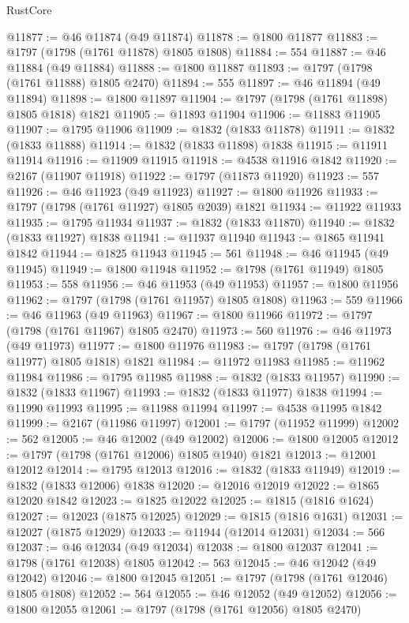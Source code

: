 \begin{lexlean}{RustCore}
\begin{coremodule}
@11877 := @46 @11874 (@49 @11874)
@11878 := @1800 @11877
@11883 := @1797 (@1798 (@1761 @11878) @1805 @1808)
@11884 := 554
@11887 := @46 @11884 (@49 @11884)
@11888 := @1800 @11887
@11893 := @1797 (@1798 (@1761 @11888) @1805 @2470)
@11894 := 555
@11897 := @46 @11894 (@49 @11894)
@11898 := @1800 @11897
@11904 := @1797 (@1798 (@1761 @11898) @1805 @1818) @1821
@11905 := @11893 @11904
@11906 := @11883 @11905
@11907 := @1795 @11906
@11909 := @1832 (@1833 @11878)
@11911 := @1832 (@1833 @11888)
@11914 := @1832 (@1833 @11898) @1838
@11915 := @11911 @11914
@11916 := @11909 @11915
@11918 := @4538 @11916 @1842
@11920 := @2167 (@11907 @11918)
@11922 := @1797 (@11873 @11920)
@11923 := 557
@11926 := @46 @11923 (@49 @11923)
@11927 := @1800 @11926
@11933 := @1797 (@1798 (@1761 @11927) @1805 @2039) @1821
@11934 := @11922 @11933
@11935 := @1795 @11934
@11937 := @1832 (@1833 @11870)
@11940 := @1832 (@1833 @11927) @1838
@11941 := @11937 @11940
@11943 := @1865 @11941 @1842
@11944 := @1825 @11943
@11945 := 561
@11948 := @46 @11945 (@49 @11945)
@11949 := @1800 @11948
@11952 := @1798 (@1761 @11949) @1805
@11953 := 558
@11956 := @46 @11953 (@49 @11953)
@11957 := @1800 @11956
@11962 := @1797 (@1798 (@1761 @11957) @1805 @1808)
@11963 := 559
@11966 := @46 @11963 (@49 @11963)
@11967 := @1800 @11966
@11972 := @1797 (@1798 (@1761 @11967) @1805 @2470)
@11973 := 560
@11976 := @46 @11973 (@49 @11973)
@11977 := @1800 @11976
@11983 := @1797 (@1798 (@1761 @11977) @1805 @1818) @1821
@11984 := @11972 @11983
@11985 := @11962 @11984
@11986 := @1795 @11985
@11988 := @1832 (@1833 @11957)
@11990 := @1832 (@1833 @11967)
@11993 := @1832 (@1833 @11977) @1838
@11994 := @11990 @11993
@11995 := @11988 @11994
@11997 := @4538 @11995 @1842
@11999 := @2167 (@11986 @11997)
@12001 := @1797 (@11952 @11999)
@12002 := 562
@12005 := @46 @12002 (@49 @12002)
@12006 := @1800 @12005
@12012 := @1797 (@1798 (@1761 @12006) @1805 @1940) @1821
@12013 := @12001 @12012
@12014 := @1795 @12013
@12016 := @1832 (@1833 @11949)
@12019 := @1832 (@1833 @12006) @1838
@12020 := @12016 @12019
@12022 := @1865 @12020 @1842
@12023 := @1825 @12022
@12025 := @1815 (@1816 @1624)
@12027 := @12023 (@1875 @12025)
@12029 := @1815 (@1816 @1631)
@12031 := @12027 (@1875 @12029)
@12033 := @11944 (@12014 @12031)
@12034 := 566
@12037 := @46 @12034 (@49 @12034)
@12038 := @1800 @12037
@12041 := @1798 (@1761 @12038) @1805
@12042 := 563
@12045 := @46 @12042 (@49 @12042)
@12046 := @1800 @12045
@12051 := @1797 (@1798 (@1761 @12046) @1805 @1808)
@12052 := 564
@12055 := @46 @12052 (@49 @12052)
@12056 := @1800 @12055
@12061 := @1797 (@1798 (@1761 @12056) @1805 @2470)

\end{coremodule}
\end{lexlean}
